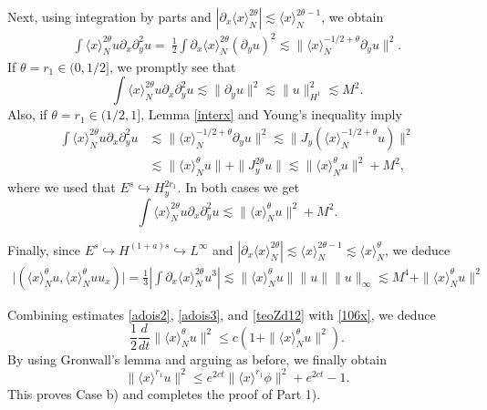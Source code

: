 \documentclass[reqno]{amsart}
\newcommand{\les}{\lesssim}
\numberwithin{equation}{section}
\begin{document}
Next, using integration by parts and 
$|\partial_{x}\langle x \rangle_{N}^{2\theta}|\les\langle x \rangle_{N}^{2\theta-1}$,
 we obtain
\begin{equation*}
\begin{split}
\int \langle x \rangle_{N}^{2\theta}u\partial_{x}\partial_{y}^{2}u=\ \frac{1}{2}\int
\partial_{x}\langle x \rangle_{N}^{2\theta}(\partial_{y}u)^2
\lesssim
\|\langle x \rangle_{N}^{-1/2+\theta}\partial_{y}u\|^2.
\end{split}
\end{equation*}
If $\theta=r_1\in(0,1/2]$, we promptly see that
\[
\int \langle x \rangle_{N}^{2\theta}u\partial_{x}\partial_{y}^{2}u\lesssim
\|\partial_{y}u\|^2\lesssim\|u\|_{H^1}^2\lesssim M^2.
\]
Also, if $\theta=r_1\in(1/2,1]$, Lemma \ref{interx} and Young's inequality imply
\begin{equation*}
\begin{split}
\int \langle x \rangle_{N}^{2\theta}u\partial_{x}\partial_{y}^{2}u
&\lesssim 
\|\langle x \rangle_{N}^{-1/2+\theta}\partial_{y}u\|^2
\lesssim \|J_y(\langle x \rangle_{N}^{-1/2+\theta}u)\|^2\\
&\lesssim \|\langle x \rangle_{N}^{\theta}u\|+\|J_{y}^{2\theta}u\|
\lesssim \|\langle x \rangle_{N}^{\theta}u\|^2+M^2,
\end{split}
\end{equation*}
where we used that $E^s\hookrightarrow H^{2r_1}_y$. In both cases we get
\begin{equation}\label{adois3}
\int \langle x \rangle_{N}^{2\theta}u\partial_{x}\partial_{y}^{2}u \lesssim \|\langle x \rangle_{N}^{\theta}u\|^2+M^2.
\end{equation}

Finally, since $E^s\hookrightarrow H^{(1+a)s}\hookrightarrow L^\infty$ and $|\partial_{x}\langle x \rangle_{N}^{2\theta}|\lesssim \langle x \rangle_{N}^{2\theta-1}\lesssim \langle x \rangle_{N}^{\theta}$, we deduce
\begin{equation}\label{teoZd12}
\begin{split}
\Big|\left(\langle x \rangle_{N}^{\theta}u,\langle x \rangle_{N}^{\theta}uu_{x}\right)\Big|=\frac{1}{3}\left|\int \partial_x\langle x \rangle_{N}^{2\theta}u^3\right|\lesssim \|\langle x \rangle_{N}^{\theta}u\|\|u\|\|u\|_\infty\lesssim M^4+\|\langle x \rangle_{N}^{\theta}u\|^2
\end{split}
\end{equation}

Combining estimates \eqref{adois2}, \eqref{adois3}, and \eqref{teoZd12} with \eqref{106x}, we deduce
\[
\frac{1}{2}\frac{d}{dt}\|\langle x \rangle_{N}^{\theta}u\|^{2}\leq c(1+\|\langle x \rangle_{N}^{\theta}u\|^2).
\]
By using Gronwall's lemma and arguing as before, we finally obtain
\begin{equation*}
\|\langle x \rangle^{r_1}u\|^{2}\leq e^{2ct}\|\langle x
\rangle^{r_1}\phi\|^{2}+e^{2ct}-1.
\end{equation*}
 This proves Case b) and completes the proof of Part 1).\\
\end{document}
